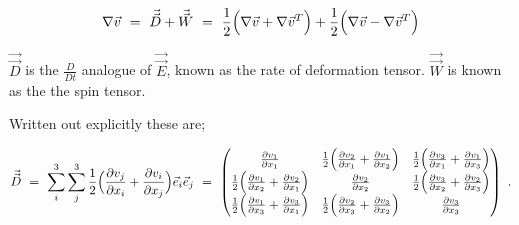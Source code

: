 \documentclass{article}
\begin{document}
\begin{equation} \label{eq:1}
\nabla{\vec{v}} \hspace{0.125cm} = \hspace{0.125cm} \vec{\vec{D}} + \vec{\vec{W}}  \hspace{0.125cm} = \hspace{0.125cm} \frac{1}{2} \Big( \nabla{\vec{v}} + \nabla{\vec{v}}^T \Big) + \frac{1}{2} \Big( \nabla{\vec{v}} - \nabla{\vec{v}}^T \Big)
\end{equation} 

\begin{math} \vec{\vec{D}} \end{math} is the \begin{math} \frac{D}{D t} \end{math} analogue of \begin{math} \vec{\vec{E}} \end{math}, known as the rate of deformation tensor. \begin{math} \vec{\vec{W}} \end{math} is known as the the spin tensor. 

Written out explicitly these are; 

\begin{equation} \label{eq:1}
\vec{\vec{D}} \hspace{0.125cm} = \hspace{0.125cm} \sum_{i}^{3} \sum_{j}^{3} \frac{1}{2} \Big( \frac{\partial{v_j}}{\partial{x_i}} + \frac{\partial{v_i}}{\partial{x_j}} \Big) \vec{e}_i \vec{e}_j  \hspace{0.125cm} =  \hspace{0.125cm}  \begin{pmatrix} \frac{\partial{v_1}}{\partial{x_1}} & \frac{1}{2} \Big( \frac{\partial{v_2}}{\partial{x_1}} + \frac{\partial{v_1}}{\partial{x_2}} \Big) & \frac{1}{2} \Big( \frac{\partial{v_3}}{\partial{x_1}} + \frac{\partial{v_1}}{\partial{x_3}} \Big) \\ \frac{1}{2} \Big( \frac{\partial{v_1}}{\partial{x_2}} + \frac{\partial{v_2}}{\partial{x_1}}  \Big) & \frac{\partial{v_2}}{\partial{x_2}} & \frac{1}{2} \Big( \frac{\partial{v_3}}{\partial{x_2}} + \frac{\partial{v_2}}{\partial{x_3}} \Big) \\ \frac{1}{2} \Big( \frac{\partial{v_1}}{\partial{x_3}} + \frac{\partial{v_3}}{\partial{x_1}} \Big) & \frac{1}{2} \Big( \frac{\partial{v_2}}{\partial{x_3}} + \frac{\partial{v_3}}{\partial{x_2}} \Big) & \frac{\partial{v_3}}{\partial{x_3}} \end{pmatrix} \hspace{0.125cm} . 
\end{equation} 
\end{document}
